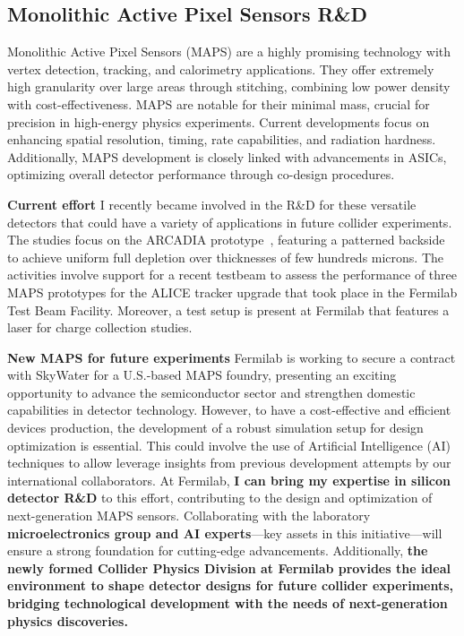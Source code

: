 {\begin{flushleft}
\vskip 10pt 
\subsection{Monolithic Active Pixel Sensors R\&D}
\vskip 5pt
Monolithic Active Pixel Sensors (MAPS) are a highly promising technology with vertex detection, tracking, and calorimetry applications. They offer extremely high granularity over large areas through stitching, combining low power density with cost-effectiveness. MAPS are notable for their minimal mass, crucial for precision in high-energy physics experiments.
Current developments focus on enhancing spatial resolution, timing, rate capabilities, and radiation hardness. Additionally, MAPS development is closely linked with advancements in ASICs, optimizing overall detector performance through co-design procedures.

\textbf{Current effort}
I recently became involved in the R\&D for these versatile detectors that could have a variety of applications in future collider experiments. The studies focus on the ARCADIA prototype~\cite{[6]}, featuring a patterned backside to achieve uniform full depletion over thicknesses of few hundreds microns. The activities involve support for a recent testbeam to assess the performance of three MAPS prototypes for the ALICE tracker upgrade that took place in the Fermilab Test Beam Facility. Moreover, a test setup is present at Fermilab that features a laser for charge collection studies.

\textbf{New MAPS for future experiments}
Fermilab is working to secure a contract with SkyWater for a U.S.-based MAPS foundry, presenting an exciting opportunity to advance the semiconductor sector and strengthen domestic capabilities in detector technology. However, to have a cost-effective and efficient devices production, the development of a robust simulation setup for design optimization is essential. This could involve the use of Artificial Intelligence (AI) techniques to allow leverage insights from previous development attempts by our international collaborators. %
At Fermilab, {\bf I can bring my expertise in silicon detector R\&D} to this effort, contributing to the design and optimization of next-generation MAPS sensors. Collaborating with the laboratory {\bf microelectronics group and AI experts}—key assets in this initiative—will ensure a strong foundation for cutting-edge advancements. Additionally, \textbf{the newly formed Collider Physics Division at Fermilab provides the ideal environment to shape detector designs for future collider experiments, bridging technological development with the needs of next-generation physics discoveries.}


\end{flushleft}}
